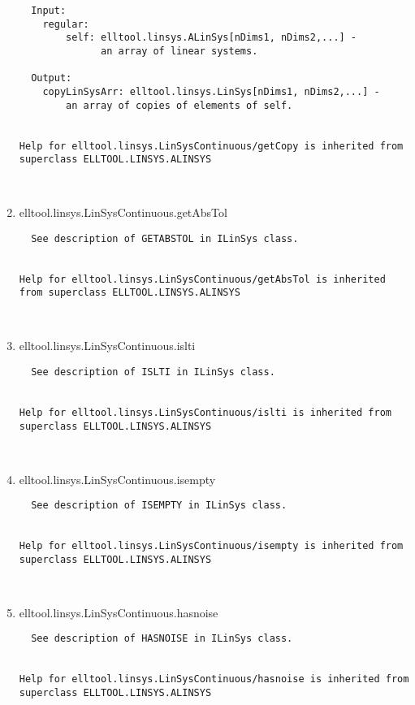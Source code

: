 \begin{enumerate}
\begin{lstlisting}
  Input:
    regular:
        self: elltool.linsys.ALinSys[nDims1, nDims2,...] -
              an array of linear systems.

  Output:
    copyLinSysArr: elltool.linsys.LinSys[nDims1, nDims2,...] -
        an array of copies of elements of self.


Help for elltool.linsys.LinSysContinuous/getCopy is inherited from superclass ELLTOOL.LINSYS.ALINSYS



\end{lstlisting}
\fontfamily{\familydefault}
\selectfont
\item {elltool.linsys.LinSysContinuous.getAbsTol}
\selectfont
\begin{lstlisting}
  See description of GETABSTOL in ILinSys class.


Help for elltool.linsys.LinSysContinuous/getAbsTol is inherited from superclass ELLTOOL.LINSYS.ALINSYS



\end{lstlisting}
\fontfamily{\familydefault}
\selectfont
\item {elltool.linsys.LinSysContinuous.islti}
\selectfont
\begin{lstlisting}
  See description of ISLTI in ILinSys class.


Help for elltool.linsys.LinSysContinuous/islti is inherited from superclass ELLTOOL.LINSYS.ALINSYS



\end{lstlisting}
\fontfamily{\familydefault}
\selectfont
\item {elltool.linsys.LinSysContinuous.isempty}
\selectfont
\begin{lstlisting}
  See description of ISEMPTY in ILinSys class.


Help for elltool.linsys.LinSysContinuous/isempty is inherited from superclass ELLTOOL.LINSYS.ALINSYS



\end{lstlisting}
\fontfamily{\familydefault}
\selectfont
\item {elltool.linsys.LinSysContinuous.hasnoise}
\selectfont
\begin{lstlisting}
  See description of HASNOISE in ILinSys class.


Help for elltool.linsys.LinSysContinuous/hasnoise is inherited from superclass ELLTOOL.LINSYS.ALINSYS




\end{lstlisting}
\end{enumerate}
